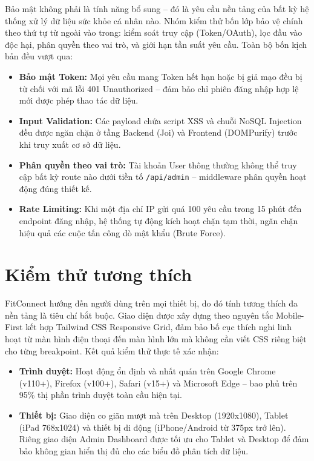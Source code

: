 Bảo mật không phải là tính năng bổ sung -- đó là yêu cầu nền tảng của bất kỳ hệ thống xử lý dữ liệu sức khỏe cá nhân nào. Nhóm kiểm thử bốn lớp bảo vệ chính theo thứ tự từ ngoài vào trong: kiểm soát truy cập (Token/OAuth), lọc đầu vào độc hại, phân quyền theo vai trò, và giới hạn tần suất yêu cầu. Toàn bộ bốn kịch bản đều vượt qua:
\begin{itemize}
    \item \textbf{Bảo mật Token:} Mọi yêu cầu mang Token hết hạn hoặc bị giả mạo đều bị từ chối với mã lỗi 401 Unauthorized -- đảm bảo chỉ phiên đăng nhập hợp lệ mới được phép thao tác dữ liệu.
    \item \textbf{Input Validation:} Các payload chứa script XSS và chuỗi NoSQL Injection đều được ngăn chặn ở tầng Backend (Joi) và Frontend (DOMPurify) trước khi truy xuất cơ sở dữ liệu.
    \item \textbf{Phân quyền theo vai trò:} Tài khoản User thông thường không thể truy cập bất kỳ route nào dưới tiền tố \texttt{/api/admin} -- middleware phân quyền hoạt động đúng thiết kế.
    \item \textbf{Rate Limiting:} Khi một địa chỉ IP gửi quá 100 yêu cầu trong 15 phút đến endpoint đăng nhập, hệ thống tự động kích hoạt chặn tạm thời, ngăn chặn hiệu quả các cuộc tấn công dò mật khẩu (Brute Force).
\end{itemize}

\section{Kiểm thử tương thích}
\label{sec:test_compatibility}

FitConnect hướng đến người dùng trên mọi thiết bị, do đó tính tương thích đa nền tảng là tiêu chí bắt buộc. Giao diện được xây dựng theo nguyên tắc Mobile-First kết hợp Tailwind CSS Responsive Grid, đảm bảo bố cục thích nghi linh hoạt từ màn hình điện thoại đến màn hình lớn mà không cần viết CSS riêng biệt cho từng breakpoint. Kết quả kiểm thử thực tế xác nhận:
\begin{itemize}
    \item \textbf{Trình duyệt:} Hoạt động ổn định và nhất quán trên Google Chrome (v110+), Firefox (v100+), Safari (v15+) và Microsoft Edge -- bao phủ trên 95\% thị phần trình duyệt toàn cầu hiện tại.
    \item \textbf{Thiết bị:} Giao diện co giãn mượt mà trên Desktop (1920x1080), Tablet (iPad 768x1024) và thiết bị di động (iPhone/Android từ 375px trở lên). Riêng giao diện Admin Dashboard được tối ưu cho Tablet và Desktop để đảm bảo không gian hiển thị đủ cho các biểu đồ phân tích dữ liệu.
\end{itemize}

